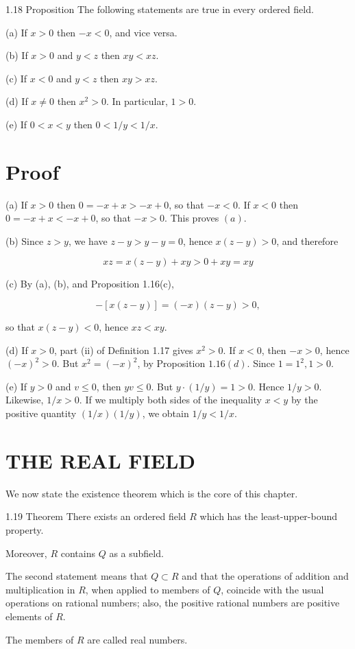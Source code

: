 \documentclass[10pt]{article}
\begin{document}
1.18 Proposition The following statements are true in every ordered field.

(a) If $x>0$ then $-x<0$, and vice versa.

(b) If $x>0$ and $y<z$ then $x y<x z$.

(c) If $x<0$ and $y<z$ then $x y>x z$.

(d) If $x \neq 0$ then $x^{2}>0$. In particular, $1>0$.

(e) If $0<x<y$ then $0<1 / y<1 / x$.

\section{Proof}
(a) If $x>0$ then $0=-x+x>-x+0$, so that $-x<0$. If $x<0$ then $0=-x+x<-x+0$, so that $-x>0$. This proves $(a)$.

(b) Since $z>y$, we have $z-y>y-y=0$, hence $x(z-y)>0$, and therefore

$$
x z=x(z-y)+x y>0+x y=x y
$$

(c) By (a), (b), and Proposition 1.16(c),

$$
-[x(z-y)]=(-x)(z-y)>0,
$$

so that $x(z-y)<0$, hence $x z<x y$.

(d) If $x>0$, part (ii) of Definition 1.17 gives $x^{2}>0$. If $x<0$, then $-x>0$, hence $(-x)^{2}>0$. But $x^{2}=(-x)^{2}$, by Proposition $1.16(d)$. Since $1=1^{2}, 1>0$.

(e) If $y>0$ and $v \leq 0$, then $y v \leq 0$. But $y \cdot(1 / y)=1>0$. Hence $1 / y>0$. Likewise, $1 / x>0$. If we multiply both sides of the inequality $x<y$ by the positive quantity $(1 / x)(1 / y)$, we obtain $1 / y<1 / x$.

\section{THE REAL FIELD}
We now state the existence theorem which is the core of this chapter.

1.19 Theorem There exists an ordered field $R$ which has the least-upper-bound property.

Moreover, $R$ contains $Q$ as a subfield.

The second statement means that $Q \subset R$ and that the operations of addition and multiplication in $R$, when applied to members of $Q$, coincide with the usual operations on rational numbers; also, the positive rational numbers are positive elements of $R$.

The members of $R$ are called real numbers.
\end{document}
